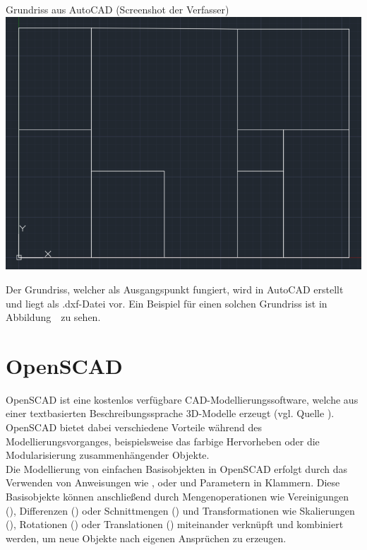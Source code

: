 \begin{Bild}{Grundriss aus AutoCAD (Screenshot der Verfasser)}
	\includegraphics[width=\textwidth]{Bilder/Grundriss}
\end{Bild}

Der Grundriss, welcher als Ausgangspunkt fungiert, wird in AutoCAD erstellt und liegt als .dxf-Datei vor.
Ein Beispiel für einen solchen Grundriss ist in Abbildung~\thebildnr\ zu sehen.

\section{OpenSCAD}
OpenSCAD ist eine kostenlos verfügbare CAD-Modellierungssoftware, welche aus einer textbasierten Beschreibungssprache 3D-Modelle erzeugt (vgl. Quelle \cite{OpenScad}).
OpenSCAD bietet dabei verschiedene Vorteile während des Modellierungsvorganges, beispielsweise das farbige Hervorheben oder die Modularisierung zusammenhängender Objekte. \\
Die Modellierung von einfachen Basisobjekten in OpenSCAD erfolgt durch das Verwenden von Anweisungen wie ,  oder  und Parametern in Klammern.
Diese Basisobjekte können anschließend durch Mengenoperationen wie Vereinigungen (), Differenzen () oder Schnittmengen () und Transformationen wie Skalierungen (), Rotationen () oder Translationen () miteinander verknüpft und kombiniert werden, um neue Objekte nach eigenen Ansprüchen zu erzeugen.

